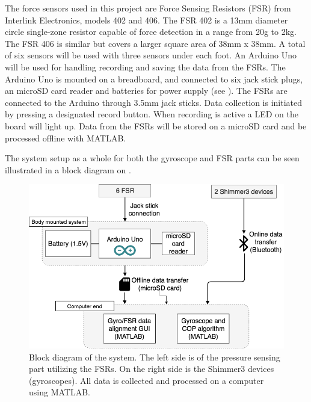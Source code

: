 The force sensors used in this project are Force Sensing Resistors (FSR) from Interlink Electronics, models 402 and 406. The FSR 402 is a 13mm diameter circle single-zone resistor capable of force detection in a range from 20g to 2kg. The FSR 406 is similar but covers a larger square area of 38mm x 38mm. \cite{IE400} A total of six sensors will be used with three sensors under each foot. 
An Arduino Uno will be used for handling recording and saving the data from the FSRs. The Arduino Uno is mounted on a breadboard, and connected to six jack stick plugs, an microSD card reader and batteries for power supply (see ). The FSRs are connected to the Arduino through 3.5mm jack sticks. Data collection is initiated by pressing a designated record button. When recording is active a LED on the board will light up. Data from the FSRs will be stored on a microSD card and be processed offline with MATLAB.


The system setup as a whole for both the gyroscope and FSR parts can be seen illustrated in a block diagram on .

\begin{figure}[H]
	\includegraphics[width=.6\textwidth]{figures/heleSystemSetup}
	\caption{Block diagram of the system. The left side is of the pressure sensing part utilizing the FSRs. On the right side is the Shimmer3 devices (gyroscopes). All data is collected and processed on a computer using MATLAB.}
	\label{fig:heleSystemSetup}  %
\end{figure}




